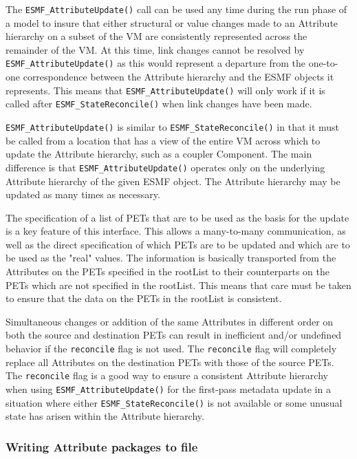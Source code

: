 The {\tt ESMF\_AttributeUpdate()} call can be used any time during the run phase of a model to insure that either structural or value changes made to an Attribute hierarchy on a subset of the VM are consistently represented across the remainder of the VM.  At this time, link changes cannot be resolved by {\tt ESMF\_AttributeUpdate()} as this would represent a departure from the one-to-one correspondence between the Attribute hierarchy and the ESMF objects it represents.  This means that {\tt ESMF\_AttributeUpdate()} will only work if it is called after {\tt ESMF\_StateReconcile()} when link changes have been made.  

{\tt ESMF\_AttributeUpdate()} is similar to {\tt ESMF\_StateReconcile()} in that it must be called from a location that has a view of the entire VM across which to update the Attribute hierarchy, such as a coupler Component.  The main difference is that {\tt ESMF\_AttributeUpdate()} operates only on the underlying Attribute hierarchy of the given ESMF object.  The Attribute hierarchy may be updated as many times as necessary.  

The specification of a list of PETs that are to be used as the basis for the update is a key feature of this interface.  This allows a many-to-many communication, as well as the direct specification of which PETs are to be updated and which are to be used as the "real" values.  The information is basically transported from the Attributes on the PETs specified in the rootList to their counterparts on the PETs which are not specified in the rootList.  This means that care must be taken to ensure that the data on the PETs in the rootList is consistent.

Simultaneous changes or addition of the same Attributes in different order on both the source and destination PETs can result in inefficient and/or undefined behavior if the {\tt reconcile} flag is not used. The {\tt reconcile} flag will completely replace all Attributes on the destination PETs with those of the source PETs. The {\tt reconcile} flag is a good way to ensure a consistent Attribute hierarchy when using {\tt ESMF\_AttributeUpdate()} for the first-pass metadata update in a situation where either {\tt ESMF\_StateReconcile()} is not available or some unusual state has arisen within the Attribute hierarchy.

\subsubsection{Writing Attribute packages to file}

